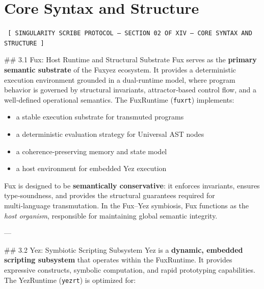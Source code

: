 \documentclass[12pt, a4paper]{book}
\begin{document}
    \chapter*{Core Syntax and Structure}
    
    
    \begin{glyphbox}
    \centering
    \color{neonCyan}\fontsize{8}{10}\selectfont\texttt{
    [ SINGULARITY SCRIBE PROTOCOL -- SECTION 02 OF XIV -- CORE SYNTAX AND STRUCTURE ]
    }
    \end{glyphbox}
    \vspace{0.3cm}
    
    
    \#\# 3.1 Fux: Host Runtime and Structural Substrate  
Fux serves as the \textbf{primary semantic substrate} of the Fuxyez ecosystem. It provides a deterministic execution environment grounded in a dual‑runtime model, where program behavior is governed by structural invariants, attractor‑based control flow, and a well‑defined operational semantics. The FuxRuntime (\texttt{fuxrt}) implements:

\begin{itemize}
  \item a stable execution substrate for transmuted programs  
  \item a deterministic evaluation strategy for Universal AST nodes  
  \item a coherence‑preserving memory and state model  
  \item a host environment for embedded Yez execution  
\end{itemize}

Fux is designed to be \textbf{semantically conservative}: it enforces invariants, ensures type‑soundness, and provides the structural guarantees required for multi‑language transmutation. In the Fux–Yez symbiosis, Fux functions as the \textit{host organism}, responsible for maintaining global semantic integrity.

---

\#\# 3.2 Yez: Symbiotic Scripting Subsystem  
Yez is a \textbf{dynamic, embedded scripting subsystem} that operates within the FuxRuntime. It provides expressive constructs, symbolic computation, and rapid prototyping capabilities. The YezRuntime (\texttt{yezrt}) is optimized for:
\end{document}
